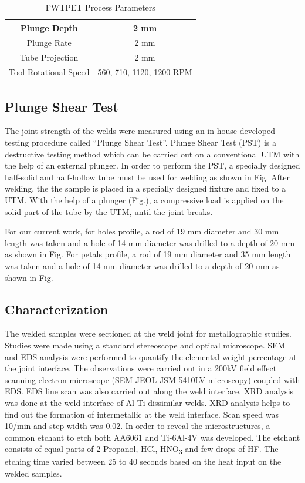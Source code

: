 \documentclass[3p]{elsarticle}
\begin{document}
\begin{table}[!htbp]
\caption{FWTPET Process Parameters}
\centering
\begin{tabular}{|c|c|}
\hline 
Plunge Depth & 2 mm \\ 
\hline 
Plunge Rate & 2 mm \\ 
\hline 
Tube Projection & 2 mm \\ 
\hline 
Tool Rotational Speed & 560, 710, 1120, 1200 RPM \\ 
\hline 
\end{tabular} 
\label{table:process-parameters} %
\end{table}

\subsection{Plunge Shear Test}
\label{subsec:Plunge Shear Test}
The joint strength of the welds were measured using an in-house developed testing procedure called ``Plunge Shear Test''. Plunge Shear Test (PST) is a destructive testing method which can be carried out on a conventional UTM with the help of an external plunger. In order to perform the PST, a specially designed half-solid and half-hollow tube must be used for welding as shown in Fig. After welding, the the sample is placed in a specially designed fixture and fixed to a UTM. With the help of a plunger (Fig.), a compressive load is applied on the solid part of the tube by the UTM, until the joint breaks.
\par
For our current work, for holes profile, a rod of 19 mm diameter and 30 mm length was taken and a hole of 14 mm diameter was drilled to a depth of 20 mm as shown in Fig. For petals profile, a rod of 19 mm diameter and 35 mm length was taken and a hole of 14 mm diameter was drilled to a depth of 20 mm as shown in Fig.


\subsection{Characterization}
\label{subsec:Characterization}
The welded samples were sectioned at the weld joint for metallographic studies. Studies were made using a standard stereoscope and optical microscope. SEM and EDS analysis were performed to quantify the elemental weight percentage at the joint interface. The observations were carried out in a 200kV field effect scanning electron microscope (SEM-JEOL JSM 5410LV microscopy) coupled with EDS. EDS line scan was also carried out along the weld interface. XRD analysis was done at the weld interface of Al-Ti dissimilar welds. XRD analysis helps to find out the formation of intermetallic at the weld interface. Scan speed was 10\degree /min and step width was 0.02\degree . In order to reveal the microstructures, a common etchant to etch both AA6061 and Ti-6Al-4V was developed. The etchant consists of equal parts of 2-Propanol, HCl, HNO\textsubscript{3} and few drops of HF. The etching time varied between 25 to 40 seconds based on the heat input on the welded samples.
\end{document}

